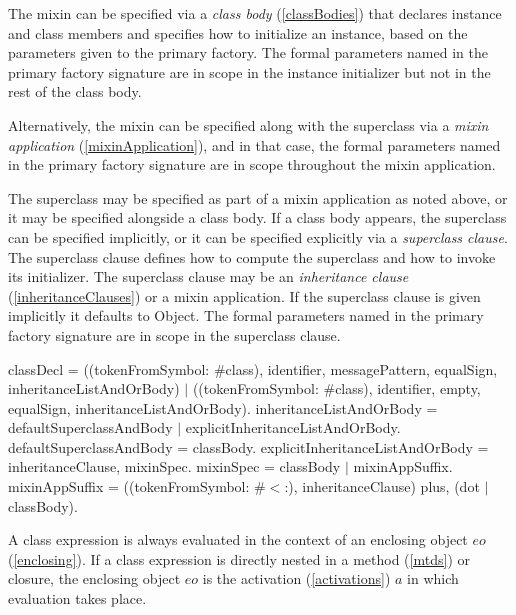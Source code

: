 \documentclass{article}
\newcommand{\code}[1]{{\sf #1}}
\begin{document}
The mixin can be specified via a {\em class body} (\ref{classBodies}) that declares instance and
class members and specifies how to initialize an instance, based on
the parameters given to the primary factory.  The formal parameters named in the
primary factory signature are in scope in the instance initializer but not in the rest of the class body. 

Alternatively, the mixin can be
specified along with the superclass via a {\em mixin application} (\ref{mixinApplication}), and in
that case,  the formal parameters named in the
primary factory signature are in scope throughout the mixin application.

The superclass may be specified as part of a mixin application as
noted above, or it may be specified alongside a
class body. If a class body appears, the superclass can be specified
implicitly, or it can be specified explicitly via a {\em superclass clause}.  The superclass clause defines how
to compute the superclass and how to invoke its initializer. The
superclass clause may be an {\em inheritance clause} (\ref{inheritanceClauses}) or a mixin
application. If the superclass clause is given implicitly
it defaults to \code{Object}.  The formal parameters named in the
primary factory signature are in scope in the superclass clause.

 \begin{newspeak}
 classDecl = ((tokenFromSymbol: \#class), identifier, messagePattern, equalSign, 
                     inheritanceListAndOrBody) $|$
                  ((tokenFromSymbol: \#class), identifier, empty, equalSign,
                     inheritanceListAndOrBody).
inheritanceListAndOrBody = defaultSuperclassAndBody $|$ 
                                     explicitInheritanceListAndOrBody.
defaultSuperclassAndBody = classBody.
explicitInheritanceListAndOrBody = inheritanceClause, mixinSpec.
mixinSpec =  classBody $|$ mixinAppSuffix.
mixinAppSuffix = ((tokenFromSymbol: \#$<$:),  inheritanceClause) plus,  
                      (dot $|$ classBody).
\end{newspeak}

A class expression is always evaluated in the context of an enclosing object $eo$  (\ref{enclosing}). If a class expression is directly nested in a method (\ref{mtds}) or closure, the enclosing object $eo$ is the activation (\ref{activations}) $a$ in which evaluation takes place.
 
\end{document}

